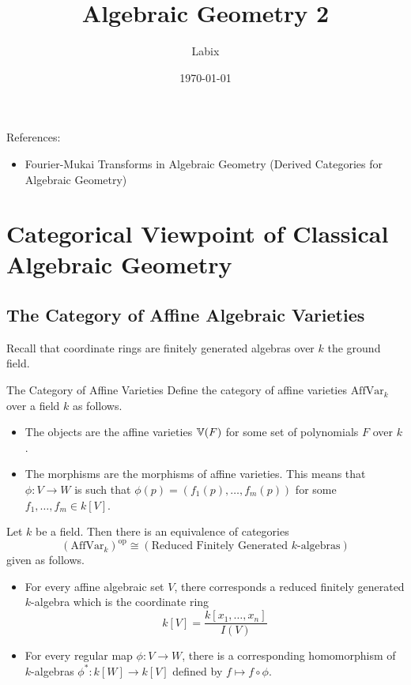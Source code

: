 \documentclass[a4paper]{article}
\title{Algebraic Geometry 2}
\author{Labix}
\date{\today}
\begin{document}
\maketitle
\begin{abstract}
\end{abstract}

References: 
\begin{itemize}
\item Fourier-Mukai Transforms in Algebraic Geometry (Derived Categories for Algebraic Geometry)
\end{itemize}
\pagebreak
\tableofcontents
\pagebreak
\section{Categorical Viewpoint of Classical Algebraic Geometry}
\subsection{The Category of Affine Algebraic Varieties}
Recall that coordinate rings are finitely generated algebras over $k$ the ground field. 

\begin{defn}{The Category of Affine Varieties}{} Define the category of affine varieties $\text{AffVar}_k$ over a field $k$ as follows. 
\begin{itemize}
\item The objects are the affine varieties $\mathbb{V}(F)$ for some set of polynomials $F$ over $k$. 
\item The morphisms are the morphisms of affine varieties. This means that $\phi:V\to W$ is such that $\phi(p)=(f_1(p),\dots,f_m(p))$ for some $f_1,\dots,f_m\in k[V]$. 
\end{itemize}
\end{defn}

\begin{prp}{}{} Let $k$ be a field. Then there is an equivalence of categories $$(\text{AffVar}_k)^\text{op}\cong(\text{Reduced Finitely Generated }k\text{-algebras})$$
given as follows. 
\begin{itemize}
\item For every affine algebraic set $V$, there corresponds a reduced finitely generated $k$-algebra which is the coordinate ring $$k[V]=\frac{k[x_1,\dots,x_n]}{I(V)}$$
\item For every regular map $\phi:V\to W$, there is a corresponding homomorphism of $k$-algebras $\phi^\ast:k[W]\to k[V]$ defined by $f\mapsto f\circ\phi$. 
\end{itemize}
\end{prp}
\end{document}
